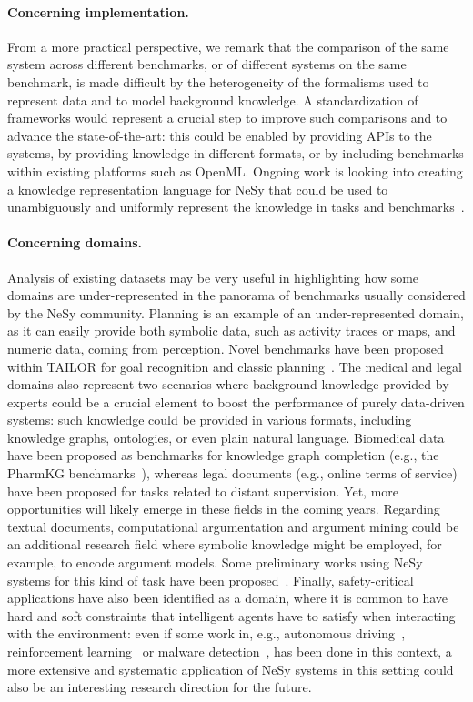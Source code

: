 \paragraph{Concerning implementation.}
From a more practical perspective, we remark that the comparison of the same system across different benchmarks, or of different systems on the same benchmark, is made difficult by the heterogeneity of the formalisms used to represent data and to model background knowledge. A standardization of frameworks would represent a crucial step to improve such comparisons and to advance the state-of-the-art: this could be enabled by providing APIs to the systems, by providing knowledge in different formats, or by including benchmarks within existing platforms such as OpenML. Ongoing work is looking into creating a knowledge representation language for NeSy that could be used to unambiguously and uniformly represent the knowledge in tasks and benchmarks~\cite{vankrieken2024uller}.

\paragraph{Concerning domains.}
Analysis of existing datasets may be very useful in highlighting how some domains are under-represented in the panorama of benchmarks usually considered by the NeSy community. Planning is an example of an under-represented domain, as it can easily provide both symbolic data, such as activity traces or maps, and numeric data, coming from perception. Novel benchmarks have been proposed within TAILOR for goal recognition and classic planning~\cite{chiari2023goal}. The medical and legal domains also represent two scenarios where background knowledge provided by experts could be a crucial element to boost the performance of purely data-driven systems: such knowledge could be provided in various formats, including knowledge graphs, ontologies, or even plain natural language. Biomedical data have been proposed as benchmarks for knowledge graph completion (e.g., the PharmKG benchmarks~\cite{zheng2021pharmkg,diligenti2023enhancing}), whereas legal documents (e.g., online terms of service) have been proposed for tasks related to distant supervision. Yet, more opportunities will likely emerge in these fields in the coming years. Regarding textual documents, computational argumentation and argument mining could be an additional research field where symbolic knowledge might be employed, for example, to encode argument models. Some preliminary works using NeSy systems for this kind of task have been proposed~\cite{galassi2021investigating}. Finally, safety-critical applications have also been identified as a domain, where it is common to have hard and soft constraints that intelligent agents have to satisfy when interacting with the environment: even if some work in, e.g., autonomous driving~\cite{stoian2024exploiting}, reinforcement learning~\cite{yang2023safe} or malware detection~\cite{vsvec2024semantic,anthony2024explainable}, has been done in this context, a more extensive and systematic application of NeSy systems in this setting could also be an interesting research direction for the future. 

